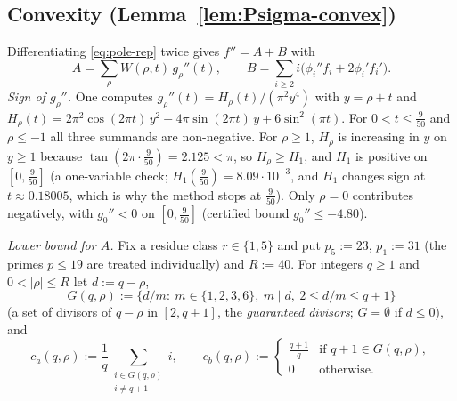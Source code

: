 \subsection{Convexity (Lemma~\ref{lem:Psigma-convex})}
Differentiating \eqref{eq:pole-rep} twice gives $f''=A+B$ with
\[
A=\sum_\rho W(\rho,t)\,g_\rho''(t),\qquad B=\sum_{i\ge2}i\bigl(\phi_i''f_i+2\phi_i'f_i'\bigr).
\]
\emph{Sign of $g_\rho''$.} One computes $g_\rho''(t)=H_\rho(t)/(\pi^2y^4)$ with $y=\rho+t$ and $H_\rho(t)=2\pi^2\cos(2\pi t)\,y^2-4\pi\sin(2\pi t)\,y+6\sin^2(\pi t)$. For $0<t\le\tfrac9{50}$ and $\rho\le-1$ all three summands are non-negative. For $\rho\ge1$, $H_\rho$ is increasing in $y$ on $y\ge1$ because $\tan(2\pi\cdot\tfrac9{50})=2.125<\pi$, so $H_\rho\ge H_{1}$, and $H_1$ is positive on $[0,\tfrac9{50}]$ (a one-variable check; $H_1(\tfrac9{50})=8.09\cdot10^{-3}$, and $H_1$ changes sign at $t\approx0.18005$, which is why the method stops at $\tfrac9{50}$). Only $\rho=0$ contributes negatively, with $g_0''<0$ on $[0,\tfrac9{50}]$ (certified bound $g_0''\le-4.80$).

\emph{Lower bound for $A$.} Fix a residue class $r\in\{1,5\}$ and put $p_5:=23$, $p_1:=31$ (the primes $p\le19$ are treated individually) and $R:=40$. For integers $q\ge1$ and $0<|\rho|\le R$ let $d:=q-\rho$,
\[
G(q,\rho):=\bigl\{d/m:\ m\in\{1,2,3,6\},\ m\mid d,\ 2\le d/m\le q+1\bigr\}
\]
(a set of divisors of $q-\rho$ in $[2,q+1]$, the \emph{guaranteed divisors}; $G=\emptyset$ if $d\le0$), and
\[
c_a(q,\rho):=\frac1q\sum_{\substack{i\in G(q,\rho)\\ i\ne q+1}}i,\qquad
c_b(q,\rho):=\begin{cases}\frac{q+1}{q}&\text{if }q+1\in G(q,\rho),\\[2pt]0&\text{otherwise.}\end{cases}
\]

